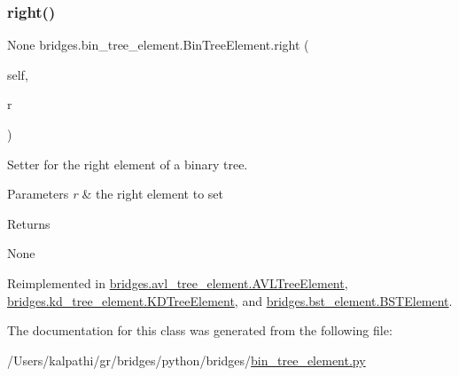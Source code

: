 \mbox{\label{classbridges_1_1bin__tree__element_1_1_bin_tree_element_a01951f6db20fcc298311ebc1562a4da7}} 
\subsubsection{\texorpdfstring{right()}{right()}\hspace{0.1cm}{\footnotesize\ttfamily [2/2]}}
{\footnotesize\ttfamily  None bridges.\+bin\+\_\+tree\+\_\+element.\+Bin\+Tree\+Element.\+right (\begin{DoxyParamCaption}\item[{}]{self,  }\item[{}]{r }\end{DoxyParamCaption})}



Setter for the right element of a binary tree. 


\begin{DoxyParams}{Parameters}
{\em r} & the right element to set \\
\hline
\end{DoxyParams}
\begin{DoxyReturn}{Returns}


None 
\end{DoxyReturn}


Reimplemented in \mbox{\hyperlink{classbridges_1_1avl__tree__element_1_1_a_v_l_tree_element_a5aa36d46b0c6ac791893823500c77a08}{bridges.\+avl\+\_\+tree\+\_\+element.\+A\+V\+L\+Tree\+Element}}, \mbox{\hyperlink{classbridges_1_1kd__tree__element_1_1_k_d_tree_element_a89071f192bee403a44f92c86a5fdc49d}{bridges.\+kd\+\_\+tree\+\_\+element.\+K\+D\+Tree\+Element}}, and \mbox{\hyperlink{classbridges_1_1bst__element_1_1_b_s_t_element_a978ae0db366dee59703ed266eebca0e9}{bridges.\+bst\+\_\+element.\+B\+S\+T\+Element}}.



The documentation for this class was generated from the following file\+:\begin{DoxyCompactItemize}
\item 
/\+Users/kalpathi/gr/bridges/python/bridges/\mbox{\hyperlink{bin__tree__element_8py}{bin\+\_\+tree\+\_\+element.\+py}}\end{DoxyCompactItemize}
